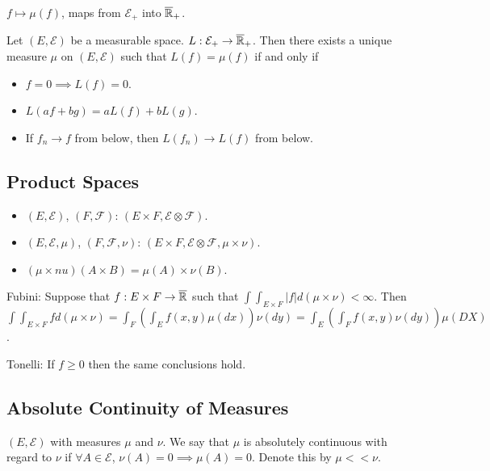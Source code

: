 \documentclass[english, course]{Notes}
\begin{document}
$f \mapsto \mu(f)$, maps from $\mathcal{E}_+$ into $\overline{\mathbb{R}}_+$.\\

\begin{theorem}
Let $(E, \mathcal{E})$ be a measurable space. $L: \mathcal{E}_+ \to \overline{\mathbb{R}}_+$. Then there exists a unique measure $\mu$ on $(E, \mathcal{E})$ such that $L(f) = \mu(f)$ if and only if

\begin{itemize}
	\item $f = 0 \implies L(f) = 0$.
	\item $L(af + bg) = aL(f) + bL(g)$.
	\item If $f_n \to f$ from below, then $L(f_n) \to L(f)$ from below.
\end{itemize}
\end{theorem}

\subsection{Product Spaces}

\begin{itemize}
	\item $(E, \mathcal{E})$, $(F, \mathcal{F})$: $(E \times F, \mathcal{E} \otimes \mathcal{F})$.
	\item $(E, \mathcal{E}, \mu)$, $(F, \mathcal{F}, \nu)$: $(E \times F, \mathcal{E} \otimes \mathcal{F}, \mu \times \nu)$.
	\item $(\mu \times nu)(A \times B) = \mu(A) \times \nu(B)$.
\end{itemize}

\begin{theorem}
Fubini: Suppose that $f: E \times F \to \overline{\mathbb{R}}$ such that $\int \int_{E \times F} |f| d(\mu \times \nu) < \infty$. Then $\int \int_{E \times F} f d(\mu \times \nu) = \int_F (\int_E f(x, y) \mu(dx)) \nu(dy) = \int_E (\int_F f(x, y) \nu(dy)) \mu(DX)$.\\
\end{theorem}

\begin{theorem}
Tonelli: If $f \geq 0$ then the same conclusions hold.
\end{theorem}

\subsection{Absolute Continuity of Measures}

\begin{definition}
$(E, \mathcal{E})$ with measures $\mu$ and $\nu$. We say that $\mu$ is absolutely continuous with regard to $\nu$ if $\forall A \in \mathcal{E}$, $\nu(A) = 0 \implies \mu(A) = 0$. Denote this by $\mu << \nu$.
\end{definition}
\end{document}
